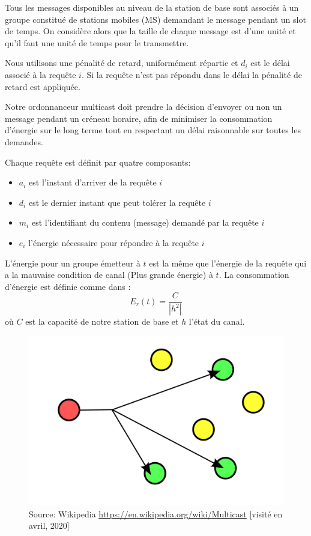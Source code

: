 \documentclass[runningheads]{llncs}
\begin{document}
Tous les messages disponibles au niveau de la station de base sont associés 
à un groupe constitué de stations mobiles (MS) demandant le message pendant 
un slot de temps.
On considère alors que la taille de chaque message est d'une unité et qu'il 
faut une unité de temps pour le transmettre.

Nous utilisons une pénalité de retard, uniformément répartie et 
$ d_i  $ est le d\'elai associé \`a la requête  $ i $. Si la requ\^ete 
n'est pas r\'epondu dans le délai la p\'enalit\'e de retard est appliqu\'ee.

Notre ordonnanceur multicast doit prendre la décision d'envoyer ou non 
un message pendant un créneau horaire, afin de minimiser la consommation 
d'énergie sur le long terme tout en respectant un délai raisonnable sur toutes les demandes.

Chaque requête est définit par quatre composants:
\begin{itemize}
    \item $a_i$ est l'instant d'arriver de la requête $i$
    \item $d_i$ est le dernier instant que peut tolérer la requête $i$
    \item $m_i$ est l'identifiant du contenu (message) demandé par la requête  $i$
    \item $e_i$ l'énergie nécessaire pour répondre à la requête $i$
\end{itemize} 

L'énergie pour un groupe émetteur à $ t $ est la même que l'énergie de la 
requête qui a la mauvaise condition de canal (Plus grande énergie) à $ t $.
La consommation d'énergie est définie comme dans \cite{huang2016}:
\begin{equation}
    E_r(t)  =  \frac {C} {| h ^ 2 |}  
\end{equation}
o\`u $C$ est la capacité  de notre station de base et $h$ l'état du canal.

\begin{figure}[H]
    \centering
    \includegraphics[scale=0.2]{multicast.png}
    \caption{Source: Wikipedia
    \url{https://en.wikipedia.org/wiki/Multicast}
    [visité en avril, 2020]}
\end{figure}
\end{document}
